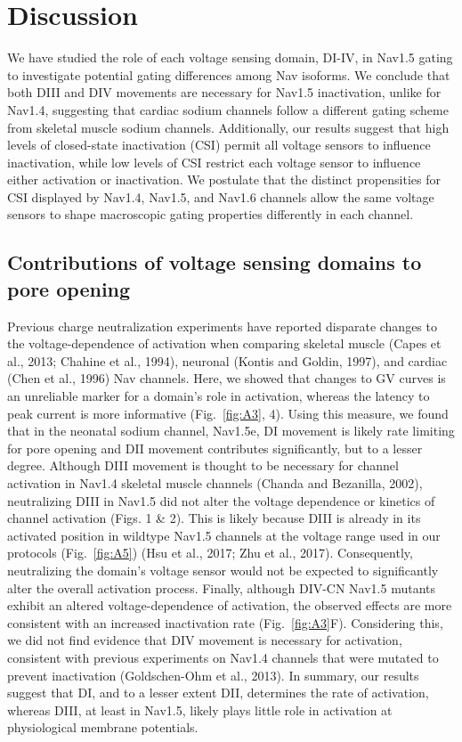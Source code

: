 \section{Discussion}
We have studied the role of each voltage sensing domain, DI-IV, in Nav1.5 gating to investigate potential gating differences among Nav isoforms. We conclude that both DIII and DIV movements are necessary for Nav1.5 inactivation, unlike for Nav1.4, suggesting that cardiac sodium channels follow a different gating scheme from skeletal muscle sodium channels. Additionally, our results suggest that high levels of closed-state inactivation (CSI) permit all voltage sensors to influence inactivation, while low levels of CSI restrict each voltage sensor to influence either activation or inactivation. We postulate that the distinct propensities for CSI displayed by Nav1.4, Nav1.5, and Nav1.6 channels allow the same voltage sensors to shape macroscopic gating properties differently in each channel.

\subsection{Contributions of voltage sensing domains to pore opening}
Previous charge neutralization experiments have reported disparate changes to the voltage-dependence of activation when comparing skeletal muscle (Capes et al., 2013; Chahine et al., 1994), neuronal (Kontis and Goldin, 1997), and cardiac (Chen et al., 1996) Nav channels. Here, we showed that changes to GV curves is an unreliable marker for a domain’s role in activation, whereas the latency to peak current is more informative (Fig.~\ref{fig:A3}, 4). Using this measure, we found that in the neonatal sodium channel, Nav1.5e, DI movement is likely rate limiting for pore opening and DII movement contributes significantly, but to a lesser degree. Although DIII movement is thought to be necessary for channel activation in Nav1.4 skeletal muscle channels (Chanda and Bezanilla, 2002), neutralizing DIII in Nav1.5 did not alter the voltage dependence or kinetics of channel activation (Figs. 1 \& 2). This is likely because DIII is already in its activated position in wildtype Nav1.5 channels at the voltage range used in our protocols (Fig.~\ref{fig:A5}) (Hsu et al., 2017; Zhu et al., 2017). Consequently, neutralizing the domain’s voltage sensor would not be expected to significantly alter the overall activation process. Finally, although DIV-CN Nav1.5 mutants exhibit an altered voltage-dependence of activation, the observed effects are more consistent with an increased inactivation rate (Fig.~\ref{fig:A3}F). Considering this, we did not find evidence that DIV movement is necessary for activation, consistent with previous experiments on Nav1.4 channels that were mutated to prevent inactivation (Goldschen-Ohm et al., 2013). In summary, our results suggest that DI, and to a lesser extent DII, determines the rate of activation, whereas DIII, at least in Nav1.5, likely plays little role in activation at physiological membrane potentials.

